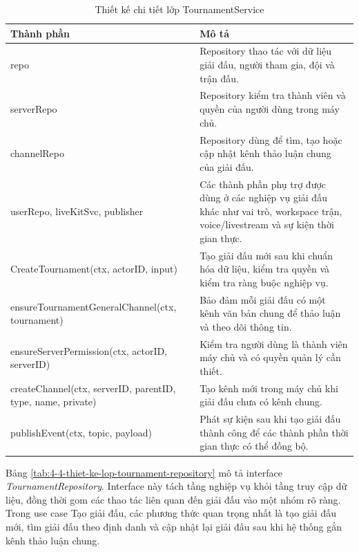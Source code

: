 \begin{table}[H]
    \centering
    \caption{Thiết kế chi tiết lớp TournamentService}
    \label{tab:4-3-thiet-ke-lop-tournament-service}
    \begin{tabular}{|p{}|p{}|}
        \hline
        \textbf{Thành phần} & \textbf{Mô tả} \\ \hline
        repo & Repository thao tác với dữ liệu giải đấu, người tham gia, đội và trận đấu. \\ \hline
        serverRepo & Repository kiểm tra thành viên và quyền của người dùng trong máy chủ. \\ \hline
        channelRepo & Repository dùng để tìm, tạo hoặc cập nhật kênh thảo luận chung của giải đấu. \\ \hline
        userRepo, liveKitSvc, publisher & Các thành phần phụ trợ được dùng ở các nghiệp vụ giải đấu khác như vai trò, workspace trận, voice/livestream và sự kiện thời gian thực. \\ \hline
        CreateTournament(ctx, actorID, input) & Tạo giải đấu mới sau khi chuẩn hóa dữ liệu, kiểm tra quyền và kiểm tra ràng buộc nghiệp vụ. \\ \hline
        ensureTournamentGeneralChannel(ctx, tournament) & Bảo đảm mỗi giải đấu có một kênh văn bản chung để thảo luận và theo dõi thông tin. \\ \hline
        ensureServerPermission(ctx, actorID, serverID) & Kiểm tra người dùng là thành viên máy chủ và có quyền quản lý cần thiết. \\ \hline
        createChannel(ctx, serverID, parentID, type, name, private) & Tạo kênh mới trong máy chủ khi giải đấu chưa có kênh chung. \\ \hline
        publishEvent(ctx, topic, payload) & Phát sự kiện sau khi tạo giải đấu thành công để các thành phần thời gian thực có thể đồng bộ. \\ \hline
    \end{tabular}
\end{table}

Bảng \ref{tab:4-4-thiet-ke-lop-tournament-repository} mô tả interface \textit{TournamentRepository}. Interface này tách tầng nghiệp vụ khỏi tầng truy cập dữ liệu, đồng thời gom các thao tác liên quan đến giải đấu vào một nhóm rõ ràng. Trong use case Tạo giải đấu, các phương thức quan trọng nhất là tạo giải đấu mới, tìm giải đấu theo định danh và cập nhật lại giải đấu sau khi hệ thống gắn kênh thảo luận chung.

